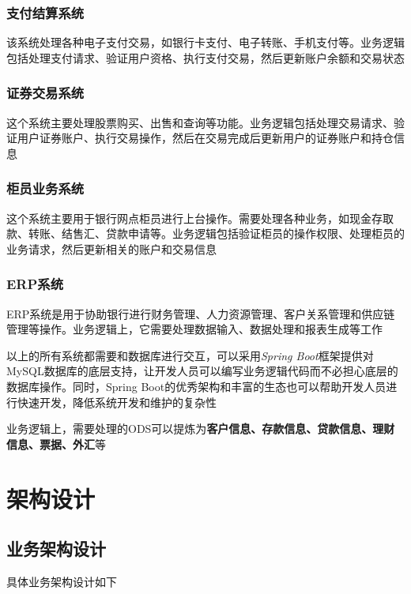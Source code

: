 \documentclass[UTF8]{ctexart} %
\begin{document}
\subsubsection{支付结算系统}

该系统处理各种电子支付交易，如银行卡支付、电子转账、手机支付等。业务逻辑包括处理支付请求、验证用户资格、执行支付交易，然后更新账户余额和交易状态

\subsubsection{证券交易系统}

这个系统主要处理股票购买、出售和查询等功能。业务逻辑包括处理交易请求、验证用户证券账户、执行交易操作，然后在交易完成后更新用户的证券账户和持仓信息

\subsubsection{柜员业务系统}

这个系统主要用于银行网点柜员进行上台操作。需要处理各种业务，如现金存取款、转账、结售汇、贷款申请等。业务逻辑包括验证柜员的操作权限、处理柜员的业务请求，然后更新相关的账户和交易信息

\subsubsection{ERP系统}

ERP系统是用于协助银行进行财务管理、人力资源管理、客户关系管理和供应链管理等操作。业务逻辑上，它需要处理数据输入、数据处理和报表生成等工作

以上的所有系统都需要和数据库进行交互，可以采用\emph{Spring Boot}框架提供对MySQL数据库的底层支持，让开发人员可以编写业务逻辑代码而不必担心底层的数据库操作。同时，Spring Boot的优秀架构和丰富的生态也可以帮助开发人员进行快速开发，降低系统开发和维护的复杂性

业务逻辑上，需要处理的ODS可以提炼为\textbf{客户信息、存款信息、贷款信息、理财信息、票据、外汇}等

\section{架构设计}

\subsection{业务架构设计}

具体业务架构设计如下
\end{document}
